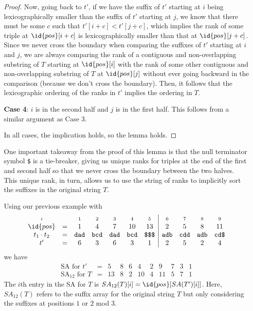 \begin{proof}
    Now, going back to $t'$, if we have the suffix of $t'$ starting at $i$ being lexicographically smaller than the suffix of $t'$ starting at $j$, we know that there must be some $c$ such that $t'[i+c] < t'[j+c]$, which implies the rank of some triple at $\id{pos}[i+c]$ is lexicographically smaller than that at $\id{pos}[j+c]$. Since we never cross the boundary when comparing the suffixes of $t'$ starting at $i$ and $j$, we are always comparing the rank of a contiguous and non-overlapping substring of $T$ starting at $\id{pos}[i]$ with the rank of some other contiguous and non-overlapping substring of $T$ at $\id{pos}[j]$ without ever going backward in the comparison (because we don't cross the boundary). Then, it follows that the lexicographic ordering of the ranks in $t'$ implies the ordering in $T$.
    
    \textbf{Case 4}: $i$ is in the second half and $j$ is in the first half. This follows from a similar argument as Case 3.

    In all cases, the implication holds, so the lemma holds.
\end{proof}

One important takeaway from the proof of this lemma is that the null terminator symbol \texttt{\$} is a tie-breaker, giving us unique ranks for triples at the end of the first and second half so that we never cross the boundary between the two halves. This unique rank, in turn, allows us to use the string of ranks to implicitly sort the suffixes in the original string $T$.

Using our previous example with
$$
\begin{array}{ccccccc|cccc}
    \scriptstyle i &  & \scriptstyle 1 & \scriptstyle 2 & \scriptstyle 3 & \scriptstyle 4 & \scriptstyle 5 & \scriptstyle 6 & \scriptstyle 7 & \scriptstyle 8 & \scriptstyle 9 \\
    \id{pos} & = & 1 & 4 & 7 & 10 & 13 &  2 & 5 & 8 & 11 \\
    t_1 \cdot t_2 & = & \texttt{dad} & \texttt{bcd} & \texttt{dad} & \texttt{bcd} & \texttt{\$\$\$} & \texttt{adb} & \texttt{cdd} & \texttt{adb} & \texttt{cd\$} \\
    t' & = & 6 & 3 & 6 & 3 & 1 & 2 & 5 & 2 & 4
\end{array}
$$
we have
$$
\begin{array}{ccccccccccc}
    \text{SA for $t'$} & = & 5 & 8 & 6 & 4 & 2 &  9 & 7 & 3 & 1 \\
    \text{SA$_{12}$ for $T$} & = & 13 & 8 & 2 & 10 & 4 & 11 & 5 & 7 & 1
\end{array}
$$
The $i$th entry in the SA for $T$ is $SA_{12}(T)[i] = \id{pos}[SA(T')[i]]$. Here, $SA_{12}(T)$ refers to the suffix array for the original string $T$ but only considering the suffixes at positions $1$ or $2$ mod $3$.

